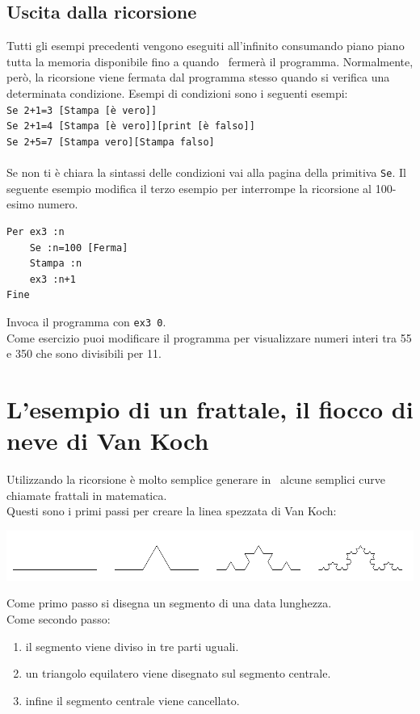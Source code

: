 \subsection{Uscita dalla ricorsione}
Tutti gli esempi precedenti vengono eseguiti all'infinito consumando piano piano tutta la memoria disponibile fino a quando \xlogo\ fermerà il programma. Normalmente, però, la ricorsione viene fermata dal programma stesso quando si verifica una determinata condizione. Esempi di condizioni sono i seguenti esempi:\\
\texttt{Se 2+1=3 [Stampa [è vero]]} \\
\texttt{Se 2+1=4 [Stampa [è vero]][print [è falso]]} \\
\texttt{Se 2+5=7 [Stampa \textquotedbl vero][Stampa \textquotedbl falso]}\\
\\
Se non ti è chiara la sintassi delle condizioni vai alla pagina della primitiva \texttt{Se}. Il seguente esempio modifica il terzo esempio per interrompe la ricorsione al 100-esimo numero.
\begin{lstlisting}[caption="Stampare un elenco di numeri inferiori a 0"]
Per ex3 :n
	Se :n=100 [Ferma]
	Stampa :n
	ex3 :n+1
Fine
\end{lstlisting}
Invoca il programma con \texttt{ex3 0}.\\
Come esercizio puoi modificare il programma per visualizzare numeri interi tra 55 e 350 che sono divisibili per 11.\\




\section{L'esempio di un frattale, il fiocco di neve di Van Koch}
\label{vankoch}
Utilizzando la ricorsione è molto semplice generare in \logo\ alcune semplici curve chiamate frattali in matematica.\\
Questi sono i primi passi per creare la linea spezzata di Van Koch:

\begin{center}
	\includegraphics[width=\textwidth]{pics/koch0123.png}
\end{center}

Come primo passo si disegna un segmento di una data lunghezza.\\
Come secondo passo:
\begin{enumerate}
	\item il segmento viene diviso in tre parti uguali.
	\item un triangolo equilatero viene disegnato sul segmento centrale.
	\item infine il segmento centrale viene cancellato.
\end{enumerate}

